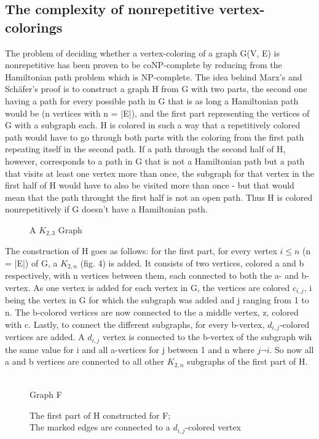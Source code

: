 \documentclass[12pt,a4paper]{article}
\begin{document}
\subsection{The complexity of nonrepetitive vertex-colorings}
The problem of deciding whether a vertex-coloring of a graph G(V, E) is nonrepetitive has been proven to be coNP-complete by reducing from the Hamiltonian path problem which is NP-complete. The idea behind Marx's and Schäfer's proof \citep{Marx2009a} is to construct a graph H from G with two parts, the second one having a path for every possible path in G that is as long a Hamiltonian path would be (n vertices with n = |E|), and the first part representing the vertices of G with a subgraph each. H is colored in such a way that a repetitively colored path would have to go through both parts with the coloring from the first path repeating itself in the second path. If a path through the second half of H, however, corresponds to a path in G that is not a Hamiltonian path but a path that visits at least one vertex more than once, the subgraph for that vertex in the first half of H would have to also be visited more than once - but that would mean that the path throught the first half is not an open path. Thus H is colored nonrepetitively if G doesn't have a Hamiltonian path.
\newline
\begin{wrapfigure}[8]{l}{3cm}
	
	\caption{A $K_{2,3}$ Graph}
\end{wrapfigure}
The construction of H goes as follows: for the first part, for every vertex $i \leq n$ (n = |E|) of G, a $K_{2, n}$ (fig. 4) is added. It consists of two vertices, colored a and b respectively, with n vertices between them, each connected to both the a- and b-vertex. As one vertex is added for each vertex in G, the vertices are colored $c_{i,j}$, i being the vertex in G for which the subgraph was added and j ranging from 1 to n. The b-colored vertices are now connected to the a middle vertex, z, colored with c. Lastly, to connect the different subgraphs, for every b-vertex, $d_{i,j}$-colored vertices are added. A $d_{i, j}$ vertex is connected to the b-vertex of the subgraph wih the same value for i and all a-vertices for j between 1 and n where $j \neg i$.  So now all a and b vertices are connected to all other $K_{2,n}$ subgraphs of the first part of H.
\newline
\begin{figure}[h]
\begin{minipage}{0.2\linewidth}
	
	\caption{\\Graph F}
\end{minipage}
\begin{minipage}{0.8\linewidth}
	
	\caption{The first part of H constructed for F; \\The marked edges are connected to a $d_{i,j}$-colored vertex}
\end{minipage}
\end{figure}
\end{document}
